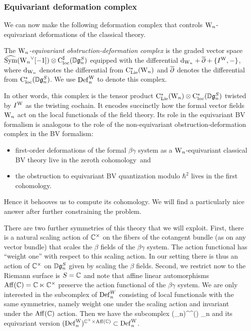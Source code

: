 \subsubsection{Equivariant deformation complex} \label{sec eq def cplx}

We can now make the following deformation complex that controls ${{\rm W}_n}$-equivariant deformations of the classical theory. 

\begin{dfn}
The {\em ${{\rm W}_n}$-equivariant obstruction-deformation complex} is 
the graded vector space $\widehat{{\rm Sym}}({{\rm W}_n}^\vee[-1]) \otimes {\rm C}^\sharp_{\rm loc}(\mathbb D\mathfrak{g}_n^S)$ 
equipped with the differential ${\rm d}_{{{\rm W}_n}} + \overline{\partial} + \{I^{\rm W},-\}$, 
where ${\rm d}_{{{\rm W}_n}}$ denotes the differential from ${\rm C}_{\rm Lie}^*({{\rm W}_n})$
and $\overline{\partial}$ denotes the differential from ${\rm C}^*_{\rm loc}(\mathbb D\mathfrak{g}_n^S)$.
We use ${\rm Def}^{\rm W}_n$ to denote this complex.
\end{dfn}

In other words, this complex is the tensor product ${\rm C}_{\rm Lie}^*({{\rm W}_n}) \otimes {\rm C}^*_{\rm loc}(\mathbb D\mathfrak{g}_n^S)$
twisted by $I^{\rm W}$ as the twisting cochain.
It encodes succinctly how the formal vector fields ${{\rm W}_n}$ act on the local functionals of the field theory.
Its role in the equivariant BV formalism is analogous to the role of the non-equivariant obstruction-deformation complex in the BV formalism:
\begin{itemize}
\item first-order deformations of the formal $\beta\gamma$ system as a ${{\rm W}_n}$-equivariant classical BV theory live in the zeroth cohomology~and
\item the obstruction to equivariant BV quantization modulo $\hbar^2$ lives in the first cohomology.
\end{itemize}
Hence it behooves us to compute its cohomology.
We will find a particularly nice answer after further constraining the problem.

There are two further symmetries of this theory that we will exploit.
First, there is a natural scaling action of $\mathbb C^\times$ on the fibers of the cotangent bundle (as on any vector bundle)
that scales the $\beta$ fields of the $\beta\gamma$ system.
The action functional has ``weight one'' with respect to this scaling action.
In our setting there is thus an action of $\mathbb C^\times$ on $\mathbb D \mathfrak{g}_n^S$ given by scaling the $\beta$ fields. 
Second, we restrict now to the Riemann surface is $S = \mathbb C$ and 
note that affine linear automorphisms ${\rm Aff}(\mathbb C) = \mathbb C \ltimes \mathbb C^\times$ preserve the action functional
of the $\beta\gamma$ system.
We are only interested in the subcomplex of ${\rm Def}^{W}_n$ consisting of local functionals with the same symmetries,
namely weight one under the scaling action and invariant under the ${\rm Aff}(\mathbb C)$ action.
Then we have the subcomplex
\ben
(\Def_n)^{\CC^\times {}(\CC)} \subset \Def_n
\een
and its equivariant version $({\rm Def}^{\rm W}_n)^{\mathbb C^\times \times {\rm
    Aff}(\mathbb C)} \subset {\rm Def}_n^{\rm W}$.

